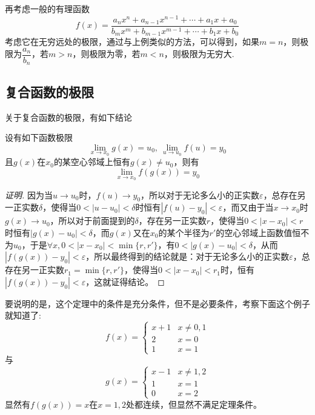 \begin{example}
  \label{example:limit-of-fraction-function}
  再考虑一般的有理函数
  \[ f(x) = \frac{a_nx^n+a_{n-1}x^{n-1}+\cdots+a_1x+a_0}{b_mx^m+b_{m-1}x^{m-1}+\cdots+b_1x+b_0} \]
考虑它在无穷远处的极限，通过与上例类似的方法，可以得到，如果$m=n$，则极限为$\dfrac{a_n}{b_n}$，若$m>n$，则极限为零，若$m<n$，则极限为无穷大.
\end{example}

\subsection{复合函数的极限}
\label{sec:limit-of-composite-function}

关于复合函数的极限，有如下结论
\begin{theorem}
  \label{theorem:limit-of-combine-function}
  设有如下函数极限
  \[ \lim_{x \to x_0}g(x) = u_0, \  \lim_{u \to u_0}f(u) = y_0 \]
  且$g(x)$在$x_0$的某空心邻域上恒有$g(x) \neq u_0$，则有
  \[ \lim_{x \to x_0} f(g(x))=y_0 \]
\end{theorem}

\begin{proof}[证明]
  因为当$u \to u_0$时，$f(u) \to y_0$，所以对于无论多么小的正实数$\varepsilon$，总存在另一正实数$\delta$，使得当$0<|u-u_0|<\delta$时恒有$|f(u)-y_0|<\varepsilon$，而又由于当$x \to x_0$时$g(x) \to u_0$，所以对于前面提到的$\delta$，存在另一正实数$r$，使得当$0<|x-x_0|<r$时恒有$|g(x)-u_0|<\delta$，而$g(x)$又在$x_0$的某个半径为$r'$的空心邻域上函数值恒不为$u_0$，于是$\forall x,0<|x-x_0|<\min\{r,r'\}$，有$0<|g(x)-u_0|<\delta$，从而$|f(g(x))-y_0|<\varepsilon$，所以最终得到的结论就是：对于无论多么小的正实数$\varepsilon$，总存在另一正实数$r_1=\min\{r,r'\}$，使得当$0<|x-x_0|<r_1$时，恒有$|f(g(x))-y_0|<\varepsilon$，这就证得结论。
\end{proof}

要说明的是，这个定理中的条件是充分条件，但不是必要条件，考察下面这个例子就知道了:
\[ f(x) =
  \begin{cases}
    x+1 & x \neq 0,1 \\
    2 & x=0 \\
    1 & x=1
  \end{cases}
\]
与
\[ g(x) =
  \begin{cases}
    x-1 & x \neq 1,2 \\
    1 & x=1 \\
    0 & x= 2
  \end{cases}
\]
显然有$f(g(x))=x$在$x=1,2$处都连续，但显然不满足定理条件。

